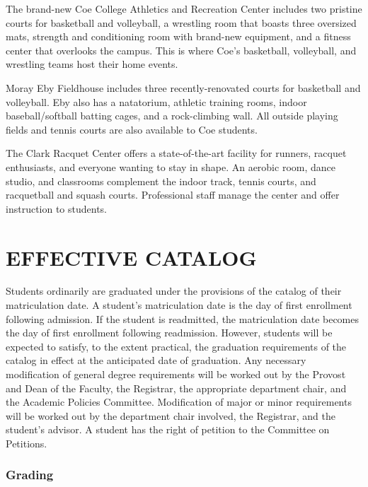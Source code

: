 \documentclass[
  letterpaper,
]{scrbook}
\renewcommand{\part}[1]{\addcontentsline{toc}{part}{#1}}
\begin{document}
The brand-new Coe College Athletics and Recreation Center includes two
pristine courts for basketball and volleyball, a wrestling room that
boasts three oversized mats, strength and conditioning room with
brand-new equipment, and a fitness center that overlooks the campus.
This is where Coe's basketball, volleyball, and wrestling teams host
their home events.

Moray Eby Fieldhouse includes three recently-renovated courts for
basketball and volleyball. Eby also has a natatorium, athletic training
rooms, indoor baseball/softball batting cages, and a rock-climbing wall.
All outside playing fields and tennis courts are also available to Coe
students.

The Clark Racquet Center offers a state-of-the-art facility for runners,
racquet enthusiasts, and everyone wanting to stay in shape. An aerobic
room, dance studio, and classrooms complement the indoor track, tennis
courts, and racquetball and squash courts. Professional staff manage the
center and offer instruction to students.

\part{COLLEGE REGULATIONS AND POLICIES}

\chapter{EFFECTIVE CATALOG}\label{effective-catalog}

Students ordinarily are graduated under the provisions of the catalog of
their matriculation date. A student's matriculation date is the day of
first enrollment following admission. If the student is readmitted, the
matriculation date becomes the day of first enrollment following
readmission. However, students will be expected to satisfy, to the
extent practical, the graduation requirements of the catalog in effect
at the anticipated date of graduation. Any necessary modification of
general degree requirements will be worked out by the Provost and Dean
of the Faculty, the Registrar, the appropriate department chair, and the
Academic Policies Committee. Modification of major or minor requirements
will be worked out by the department chair involved, the Registrar, and
the student's advisor. A student has the right of petition to the
Committee on Petitions.

\subsection{Grading}\label{sec-grading}
\end{document}
